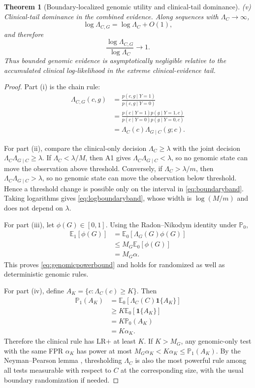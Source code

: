 \documentclass[journal]{IEEEtran}
\newtheorem{theorem}{Theorem}
\newcommand{\Pone}{\mathbb{P}_1}
\newcommand{\Pzero}{\mathbb{P}_0}
\newcommand{\Eone}{\mathbb{E}_1}
\newcommand{\Ezero}{\mathbb{E}_0}
\newcommand{\LR}{\Lambda}
\newcommand{\ind}{\mathbf{1}}
\begin{document}
\begin{theorem}[Boundary-localized genomic utility and clinical-tail dominance]
\emph{(v) Clinical-tail dominance in the combined evidence.} Along sequences with $\LR_C\to\infty$,
\begin{equation}
\log \LR_{C,G}
=\log \LR_C+O(1),
\end{equation}
and therefore
\begin{equation}
\boxed{
\frac{\log\LR_{C,G}}{\log\LR_C}\to1.
}
\label{eq:taildominance}
\end{equation}
Thus bounded genomic evidence is asymptotically negligible relative to the accumulated clinical log-likelihood in the extreme clinical-evidence tail.
\end{theorem}

\begin{proof}
Part (i) is the chain rule:
\begin{align}
\LR_{C,G}(c,g)
&=\frac{p(c,g\mid Y=1)}{p(c,g\mid Y=0)}\\
&=\frac{p(c\mid Y=1)p(g\mid Y=1,c)}
        {p(c\mid Y=0)p(g\mid Y=0,c)}\\
&=\LR_C(c)\LR_{G\mid C}(g;c).
\end{align}

For part (ii), compare the clinical-only decision $\LR_C\ge\lambda$ with the joint decision $\LR_C\LR_{G\mid C}\ge\lambda$. If $\LR_C<\lambda/M$, then A1 gives $\LR_C\LR_{G\mid C}<\lambda$, so no genomic state can move the observation above threshold. Conversely, if $\LR_C>\lambda/m$, then $\LR_C\LR_{G\mid C}>\lambda$, so no genomic state can move the observation below threshold. Hence a threshold change is possible only on the interval in \eqref{eq:boundaryband}. Taking logarithms gives \eqref{eq:logboundaryband}, whose width is $\log(M/m)$ and does not depend on $\lambda$.

For part (iii), let $\phi(G)\in[0,1]$. Using the Radon--Nikodym identity under $\Pzero$,
\begin{align}
\Eone[\phi(G)]
&=\Ezero[\LR_G(G)\phi(G)]\\
&\le M_G\Ezero[\phi(G)]\\
&=M_G\alpha.
\end{align}
This proves \eqref{eq:genomicpowerbound} and holds for randomized as well as deterministic genomic rules.

For part (iv), define $A_K=\{c:\LR_C(c)\ge K\}$. Then
\begin{align}
\Pone(A_K)
&=\Ezero[\LR_C(C)\ind\{A_K\}]\\
&\ge K\Ezero[\ind\{A_K\}]\\
&=K\Pzero(A_K)\\
&=K\alpha_K.
\end{align}
Therefore the clinical rule has LR$+$ at least $K$. If $K>M_G$, any genomic-only test with the same FPR $\alpha_K$ has power at most $M_G\alpha_K<K\alpha_K\le\Pone(A_K)$. By the Neyman--Pearson lemma \cite{NeymanPearson1933}, thresholding $\LR_C$ is also the most powerful rule among all tests measurable with respect to $C$ at the corresponding size, with the usual boundary randomization if needed.


\end{proof}
\end{document}
